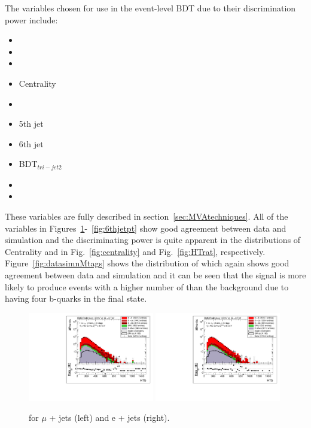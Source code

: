 The variables chosen for use in the event-level BDT due to their discrimination power include:
\begin{multicols}{2}
\begin{itemize}
\item \njets
\item \nMtags
\item \HTb
\item Centrality
\item \HTrat
\item 5th jet \pt
\item 6th jet \pt
\item BDT$_{tri-jet2}$
\item \sumjetmassX
\item \HTX
\end{itemize}
\end{multicols}
These variables are fully described in section~\ref{sec:MVAtechniques}. All of the variables in Figures~\ref{fig:HTb}-~\ref{fig:6thjetpt} show good agreement between data and simulation and the discriminating power is quite apparent in the distributions of Centrality and \HTrat in Fig.~\ref{fig:centrality} and Fig.~\ref{fig:HTrat}, respectively. Figure~\ref{fig:datasimnMtags} shows the distribution of \nMtags which again shows good agreement between data and simulation and it can be seen that the \tttt signal is more likely to produce events with a higher number of \nMtags than the background due to having four b-quarks in the final state.


\begin{figure}[!ht]
    \includegraphics[clip, trim=0.15cm 0.15cm 0.15cm 0.1cm, width=0.49\textwidth]{images/Run1/HTb_SelectedJets_StackLogY_Mu.pdf}
    \includegraphics[clip, trim=0.15cm 0.15cm 0.15cm 0.1cm, width=0.49\textwidth]{images/Run1/HTb_SelectedJets_StackLogY_e.pdf}
    \caption{\HTb for $\mu$ + jets (left) and e + jets (right).}
    \label{fig:HTb}
\end{figure}


